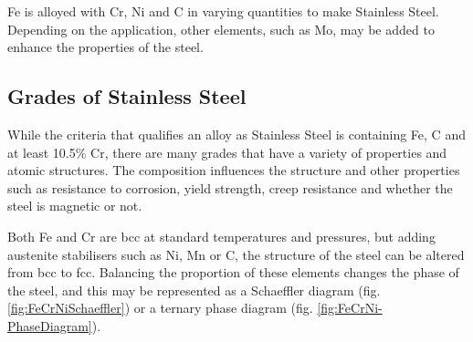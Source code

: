 \Gls{Fe} is alloyed with \Gls{Cr}, \Gls{Ni} and \Gls{C} in varying quantities to make Stainless Steel.  Depending on the application, other elements, such as \Gls{Mo}, may be added to enhance the properties of the steel.

\subsection{Grades of Stainless Steel}

While the criteria that qualifies an alloy as Stainless Steel is containing Fe, \Gls{C} and at least 10.5\% Cr, there are many grades that have a variety of properties and atomic structures.  The composition influences the structure and other properties such as resistance to corrosion, yield strength, creep resistance and whether the steel is magnetic or not.

Both Fe and Cr are \acrshort{bcc} at standard temperatures and pressures, but adding austenite stabilisers such as Ni, Mn or C, the structure of the steel can be altered from \acrshort{bcc} to \acrshort{fcc}.  Balancing the proportion of these elements changes the phase of the steel, and this may be represented as a Schaeffler diagram (fig. \ref{fig:FeCrNiSchaeffler}\cite{fecrschaeffler}) or a ternary phase diagram (fig. \ref{fig:FeCrNi-PhaseDiagram}\cite{fenicrternaryphase}).

